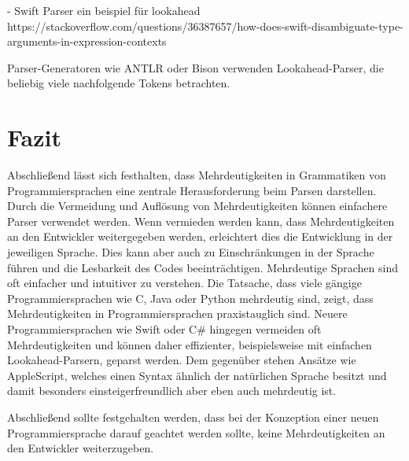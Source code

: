 \documentclass[runningheads]{llncs}
\begin{document}
	- Swift Parser ein beispiel für lookahead https://stackoverflow.com/questions/36387657/how-does-swift-disambiguate-type-arguments-in-expression-contexts

	Parser-Generatoren wie ANTLR oder Bison verwenden Lookahead-Parser,
	die beliebig viele nachfolgende Tokens betrachten.


	\section{Fazit}\label{sec:zusammenfassung}

	Abschließend lässt sich festhalten, dass Mehrdeutigkeiten in Grammatiken von Programmiersprachen
	eine zentrale Herausforderung beim Parsen darstellen.
	Durch die Vermeidung und Auflösung von Mehrdeutigkeiten können einfachere Parser verwendet werden.
	Wenn vermieden werden kann, dass Mehrdeutigkeiten an den Entwickler weitergegeben werden,
	erleichtert dies die Entwicklung in der jeweiligen Sprache.
	Dies kann aber auch zu Einschränkungen in der Sprache führen und die Lesbarkeit des Codes beeinträchtigen.
	Mehrdeutige Sprachen sind oft einfacher und intuitiver zu verstehen.
	Die Tatsache, dass viele gängige Programmiersprachen wie C, Java oder Python mehrdeutig sind,
	zeigt, dass Mehrdeutigkeiten in Programmiersprachen praxistauglich sind.
	Neuere Programmiersprachen wie Swift oder C# hingegen vermeiden oft Mehrdeutigkeiten
	und können daher effizienter, beispielsweise mit einfachen Lookahead-Parsern, geparst werden.
	Dem gegenüber stehen Ansätze wie AppleScript,
	welches einen Syntax ähnlich der natürlichen Sprache besitzt
	und damit besonders einsteigerfreundlich aber eben auch mehrdeutig ist.

	Abschließend sollte festgehalten werden, dass bei der Konzeption einer neuen Programmiersprache
	darauf geachtet werden sollte, keine Mehrdeutigkeiten an den Entwickler weiterzugeben.

%
%
%


	\nocite{*}
	
	
\end{document}
